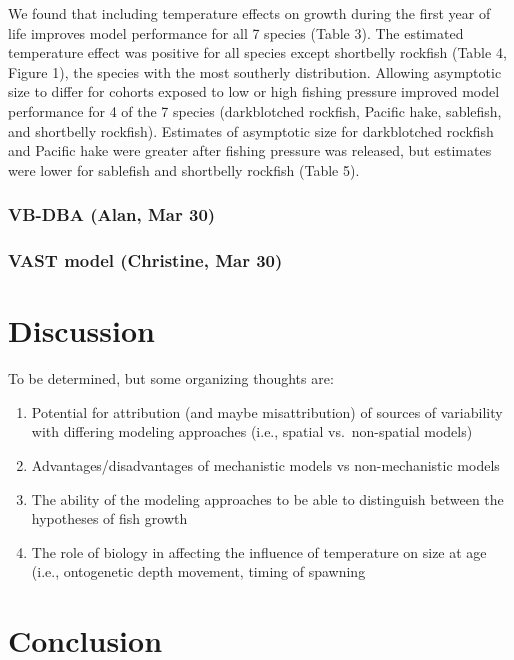 \documentclass[]{article}
\begin{document}
We found that including temperature effects on growth during the first
year of life improves model performance for all 7 species (Table 3). The
estimated temperature effect was positive for all species except
shortbelly rockfish (Table 4, Figure 1), the species with the most
southerly distribution. Allowing asymptotic size to differ for cohorts
exposed to low or high fishing pressure improved model performance for 4
of the 7 species (darkblotched rockfish, Pacific hake, sablefish, and
shortbelly rockfish). Estimates of asymptotic size for darkblotched
rockfish and Pacific hake were greater after fishing pressure was
released, but estimates were lower for sablefish and shortbelly rockfish
(Table 5).

\hypertarget{vb-dba-alan-mar-30}{%
\subsubsection{VB-DBA (Alan, Mar 30)}\label{vb-dba-alan-mar-30}}

\hypertarget{vast-model-christine-mar-30}{%
\subsubsection{VAST model (Christine, Mar
30)}\label{vast-model-christine-mar-30}}

\hypertarget{discussion}{%
\section{Discussion}\label{discussion}}

To be determined, but some organizing thoughts are:

\begin{enumerate}
\def\labelenumi{\arabic{enumi})}
\item
  Potential for attribution (and maybe misattribution) of sources of
  variability with differing modeling approaches (i.e., spatial
  vs.~non-spatial models)
\item
  Advantages/disadvantages of mechanistic models vs non-mechanistic
  models
\item
  The ability of the modeling approaches to be able to distinguish
  between the hypotheses of fish growth
\item
  The role of biology in affecting the influence of temperature on size
  at age (i.e., ontogenetic depth movement, timing of spawning
\end{enumerate}

\hypertarget{conclusion}{%
\section{Conclusion}\label{conclusion}}
\end{document}
